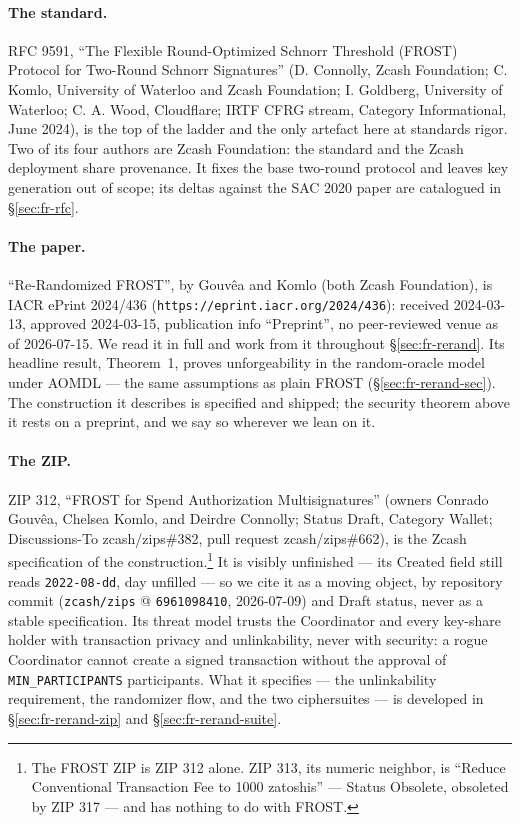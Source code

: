 \documentclass[11pt,a4paper]{article}
\theoremstyle{definition}
\begin{document}
\paragraph{The standard.} RFC 9591, ``The Flexible Round-Optimized
Schnorr Threshold (FROST) Protocol for Two-Round Schnorr Signatures''
(D. Connolly, Zcash Foundation; C. Komlo, University of Waterloo and
Zcash Foundation; I. Goldberg, University of Waterloo; C. A. Wood,
Cloudflare; IRTF CFRG stream, Category Informational, June 2024), is the
top of the ladder and the only artefact here at standards rigor. Two of
its four authors are Zcash Foundation: the standard and the Zcash
deployment share provenance. It fixes the base two-round protocol and
leaves key generation out of scope; its deltas against the SAC 2020 paper
are catalogued in \S\ref{sec:fr-rfc}.

\paragraph{The paper.} ``Re-Randomized FROST'', by Gouv\^ea and Komlo
(both Zcash Foundation), is IACR ePrint 2024/436
(\texttt{https://eprint.iacr.org/2024/436}): received 2024-03-13,
approved 2024-03-15, publication info ``Preprint'', no peer-reviewed
venue as of 2026-07-15. We read it in full and work from it throughout
\S\ref{sec:fr-rerand}. Its headline result, Theorem~1, proves
unforgeability in the random-oracle model under AOMDL --- the same
assumptions as plain FROST (\S\ref{sec:fr-rerand-sec}). The construction
it describes is specified and shipped; the security theorem above it
rests on a preprint, and we say so wherever we lean on it.

\paragraph{The ZIP.} ZIP 312, ``FROST for Spend Authorization
Multisignatures'' (owners Conrado Gouv\^ea, Chelsea Komlo, and Deirdre
Connolly; Status Draft, Category Wallet; Discussions-To zcash/zips\#382,
pull request zcash/zips\#662), is the Zcash specification of the
construction.\footnote{The FROST ZIP is ZIP 312 alone. ZIP 313, its
numeric neighbor, is ``Reduce Conventional Transaction Fee to 1000
zatoshis'' --- Status Obsolete, obsoleted by ZIP 317 --- and has nothing
to do with FROST.} It is visibly unfinished --- its Created field still
reads \texttt{2022-08-dd}, day unfilled --- so we cite it as a moving
object, by repository commit (\texttt{zcash/zips} @
\texttt{6961098410}, 2026-07-09) and Draft status, never as a stable
specification. Its threat model trusts the Coordinator and every
key-share holder with transaction privacy and unlinkability, never with
security: a rogue Coordinator cannot create a signed transaction without
the approval of \texttt{MIN\_PARTICIPANTS} participants. What it
specifies --- the unlinkability requirement, the randomizer flow, and the
two ciphersuites --- is developed in \S\ref{sec:fr-rerand-zip} and
\S\ref{sec:fr-rerand-suite}.
\end{document}
